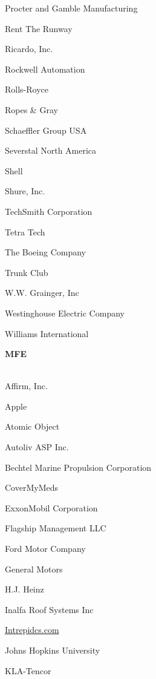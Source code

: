 \documentclass[twoside]{article}
\begin{document}
\begin{center}
\begin{multicols}{5}
\begin{FlushLeft}
\begin{compactitem}
\item Procter and Gamble Manufacturing
\item Rent The Runway
\item Ricardo, Inc.
\item Rockwell Automation
\item Rolls-Royce
\item Ropes \& Gray
\item Schaeffler Group USA
\item Severstal North America
\item Shell
\item Shure, Inc.
\item TechSmith Corporation
\item Tetra Tech
\item The Boeing Company
\item Trunk Club
\item W.W. Grainger, Inc
\item Westinghouse Electric Company
\item Williams International
\end{compactitem}
        \end{FlushLeft}
        \vspace{1em}
        {\fontsize{14}{16}\selectfont \bf MFE}\\
        \vspace{-1em}
        ~\hrulefill~
        \vspace{-.9em}
        \begin{FlushLeft}
        \begin{compactitem}
        \item Affirm, Inc.
\item Apple
\item Atomic Object
\item Autoliv ASP Inc.
\item Bechtel Marine Propulsion Corporation
\item CoverMyMeds
\item ExxonMobil Corporation
\item Flagship Management LLC
\item Ford Motor Company
\item General Motors
\item H.J. Heinz
\item Inalfa Roof Systems Inc
\item \url{Intrepidcs.com}
\item Johns Hopkins University
\item KLA-Tencor

\end{compactitem}
\end{FlushLeft}
\end{multicols}
\end{center}
\end{document}
